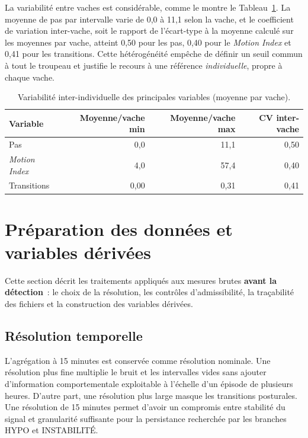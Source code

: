 La variabilité entre vaches est considérable, comme le montre le
Tableau~\ref{tab:variabilite}. La moyenne de
pas par intervalle varie de 0,0 à 11,1 selon la vache, et le coefficient de variation
inter-vache, soit le rapport de l'écart-type à la moyenne calculé sur les moyennes par vache,
atteint 0,50 pour les pas, 0,40 pour le \textit{Motion Index} et 0,41 pour les
transitions. Cette hétérogénéité empêche de définir un seuil commun à tout le troupeau et justifie le
recours à une référence \emph{individuelle}, propre à chaque vache.

\begin{table}[H]
  \centering
  \caption{Variabilité inter-individuelle des principales variables (moyenne par vache).}
  \label{tab:variabilite}
  \small
  \begin{tabular}{lrrr}
    \toprule
    Variable & Moyenne/vache min & Moyenne/vache max & CV inter-vache \\
    \midrule
    Pas & 0,0 & 11,1 & 0,50 \\
    \textit{Motion Index} & 4,0 & 57,4 & 0,40 \\
    Transitions & 0,00 & 0,31 & 0,41 \\
    \bottomrule
  \end{tabular}
\end{table}

\section{Préparation des données et variables dérivées}
Cette section décrit les traitements appliqués aux mesures brutes \textbf{avant la détection}~: le
choix de la résolution, les contrôles d'admissibilité, la traçabilité des fichiers et la
construction des variables dérivées.

\subsection{Résolution temporelle}
\label{sec:resolution_temporelle}
L'agrégation à 15 minutes est conservée comme résolution nominale. Une résolution plus
fine multiplie le bruit et les intervalles vides sans ajouter d'information comportementale
exploitable à l'échelle d'un épisode de plusieurs heures. D'autre part, une résolution plus
large masque les transitions posturales. Une résolution de 15 minutes permet d'avoir un compromis entre stabilité du
signal et granularité suffisante pour la persistance recherchée par les branches HYPO et
INSTABILITÉ.

